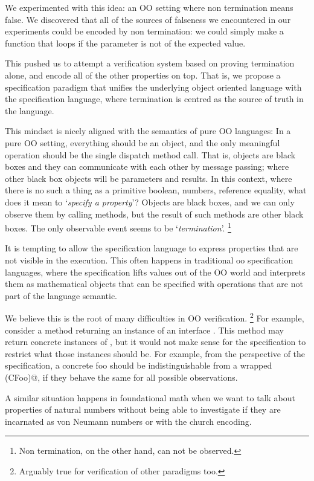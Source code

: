 \documentclass[runningheads]{llncs}
\begin{document}
We experimented with this idea: an OO setting where non termination means false. We discovered that all of the sources of falseness we encountered in our experiments could be encoded by non termination: we could simply make a function that loops if the parameter is not of the expected value.

This pushed us to attempt a verification system based on proving termination alone, and encode all of the other properties on top.
That is, we propose a specification paradigm that unifies the underlying object oriented language with the specification language, where termination is centred as the source of truth in the language.

This mindset is nicely aligned with the semantics of pure OO languages:
In a pure OO setting, everything should be an object, and the only meaningful operation should be the single dispatch method call.
That is, objects are black boxes and they can communicate with each other by message passing; where other black box objects will be parameters and results.
In this context, where there is no such a thing as a primitive boolean, numbers, reference equality, what does it mean to `\emph{specify a property}'?
Objects are black boxes, and we can only observe them by calling methods, but the result of such methods are other black boxes.
The only observable event seems to be `\emph{termination}'. \footnote{Non termination, on the other hand, can not be observed.}

It is tempting to allow the specification language to express properties that are not visible in the execution. This often happens in traditional oo specification languages, where the specification lifts values out of the OO world and interprets them as mathematical objects that can be specified with operations that are not part of the language semantic.

We believe this is the root of many difficulties in OO verification.
\footnote{ Arguably true for verification of other paradigms too.}
For example, consider a method returning an instance of an interface \Q@Foo@.
This method may return concrete instances of \Q@Foo@, but it would not make sense for the specification to restrict what those instances should be.
For example, from the perspective of the specification, a concrete foo \Q@CFoo@ should be indistinguishable from a wrapped \Q@D(CFoo)@, if they behave the same for all possible observations.

A similar situation happens in foundational math when we want to talk about properties of natural numbers without being able to investigate if they are incarnated as von Neumann numbers or with the church encoding.
\end{document}
